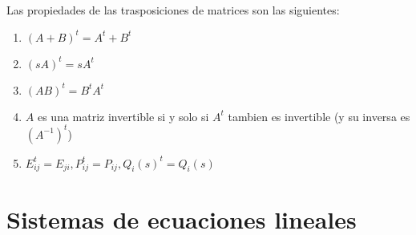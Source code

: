 \begin{proposition}
	Las propiedades de las trasposiciones de matrices son las siguientes:
	\begin{enumerate}
		\item \((A+B)^{t} = A^{t} + B^{t} \)
		\item \((sA)^{t} = sA^{t}  \)
		\item \((AB)^{t} = B^{t}A^{t}   \)
		\item \(A \) es una matriz invertible si y solo si \(A^{t }\) tambien es invertible (y su inversa es \((A^{-1} )^{t} \))
		\item \(E^{t}_{ij} = E_{ji}, P^{t}_{ij} = P_{ij}, Q_i(s)^{t} = Q_i(s)   \)
	\end{enumerate}
\end{proposition}

\section{Sistemas de ecuaciones lineales}

